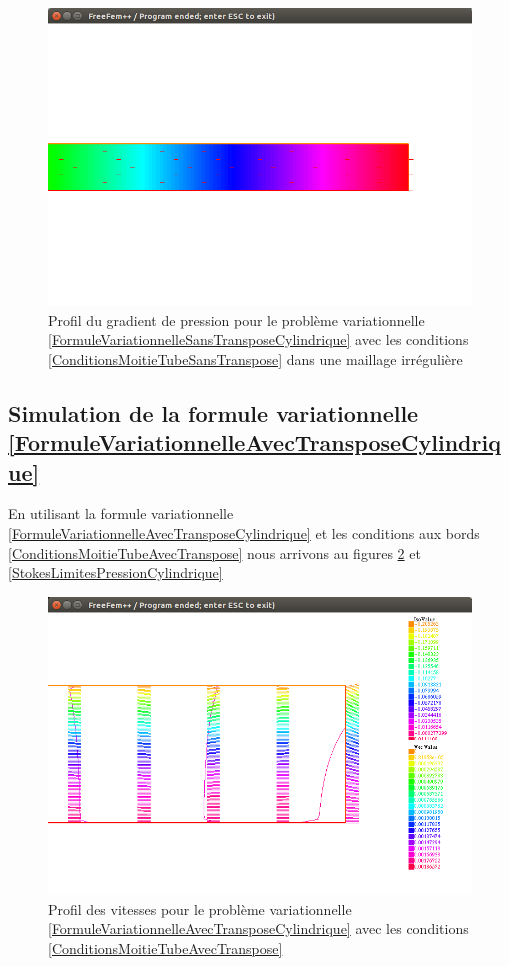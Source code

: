 \documentclass[11pt,a4paper]{article}
\numberwithin{equation}{subsection}
\numberwithin{figure}{subsection}
\begin{document}
\begin{figure}
\centering
\includegraphics[scale=0.4]{StokesClassiquePressionCylindriqueIrregulier.png}
\caption{Profil du gradient de pression pour le problème variationnelle \ref{FormuleVariationnelleSansTransposeCylindrique} avec les conditions \ref{ConditionsMoitieTubeSansTranspose} dans une maillage irrégulière}
\label{StokesClassiquePressionCylindriqueIrregulier}
\end{figure}

\subsection{Simulation de la formule variationnelle \ref{FormuleVariationnelleAvecTransposeCylindrique}}

En utilisant la formule variationnelle \ref{FormuleVariationnelleAvecTransposeCylindrique} et les conditions aux bords \ref{ConditionsMoitieTubeAvecTranspose} nous arrivons au figures \ref{StokesLimitesVitesseCylindrique} et \ref{StokesLimitesPressionCylindrique}

\begin{figure}
\centering
\includegraphics[scale=0.4]{StokesLimitesVitesseCylindrique.png}
\caption{Profil des vitesses pour le problème variationnelle \ref{FormuleVariationnelleAvecTransposeCylindrique} avec les conditions \ref{ConditionsMoitieTubeAvecTranspose}}
\label{StokesLimitesVitesseCylindrique}
\end{figure}
\end{document}
